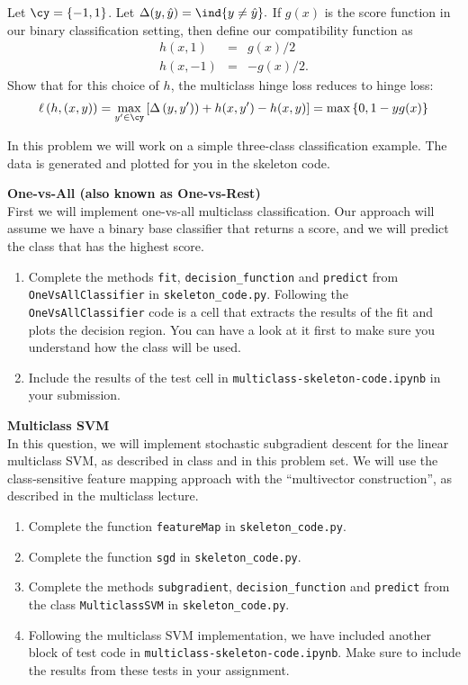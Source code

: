 \documentclass{article}
\newcommand{\nyuparagraph}[1]{\vspace{0.3cm}\textcolor{nyupurple}{\bf \large #1}\\}
\theoremstyle{plain}
\theoremstyle{definition}
\begin{document}
Let $\cy=\left\{ -1,1\right\} $. Let $\Delta(y,\hat{y})=\ind{y\neq\hat{y}}.$
If $g(x)$ is the score function in our binary classification setting,
then define our compatibility function as 
\begin{eqnarray*}
h(x,1) & = & g(x)/2\\
h(x,-1) & = & -g(x)/2.
\end{eqnarray*}
Show that for this choice of $h$, the multiclass hinge loss reduces
to hinge loss: 
\[
\ell\left(h,\left(x,y\right)\right)=\max_{y'\in\cy}\left[\Delta\left(y,y')\right)+h(x,y')-h(x,y)\right]=\max\left\{ 0,1-yg(x)\right\} 
\]

In this problem we will work on a simple three-class classification
example.
The data is generated and plotted for you in the skeleton code. 

\nyuparagraph{One-vs-All (also known as One-vs-Rest)}

First we will implement one-vs-all multiclass classification.
Our approach will assume we have a binary base classifier that returns
a score, and we will predict the class that has the highest score. 
\begin{enumerate}
  \setcounter{enumi}{\value{saveenum}}
\item \text{[coding]} Complete the methods \texttt{fit}, \texttt{decision\_function} and \texttt{predict} from \texttt{OneVsAllClassifier}  in \texttt{skeleton\_code.py}. Following
the \texttt{OneVsAllClassifier} code is a cell that extracts the results of
the fit and plots the decision region. You can have a look at it first to make sure you understand how the class will be used.
\item  Include the results of the test cell in \texttt{multiclass-skeleton-code.ipynb} in your submission.
\setcounter{saveenum}{\value{enumi}}
\end{enumerate}


\nyuparagraph{Multiclass SVM}

In this question, we will implement stochastic subgradient descent
for the linear multiclass SVM, as described in class and in this
problem set. We will use the class-sensitive feature mapping approach
with the ``multivector construction'', as described in the multiclass lecture.
\begin{enumerate}
  \setcounter{enumi}{\value{saveenum}}
\item \text{[coding]} Complete the function \texttt{featureMap} in \texttt{skeleton\_code.py}.
\item\text{[coding]}  Complete the function \texttt{sgd} in \texttt{skeleton\_code.py}.
\item \text{[coding]} Complete the methods \texttt{subgradient}, \texttt{decision\_function} and \texttt{predict} from the class \texttt{MulticlassSVM} in \texttt{skeleton\_code.py}.
\item Following the multiclass
SVM implementation, we have included another block of test code in \texttt{multiclass-skeleton-code.ipynb}. Make
sure to include the results from these tests in your assignment. 
\setcounter{saveenum}{\value{enumi}}
\end{enumerate}
\end{document}
